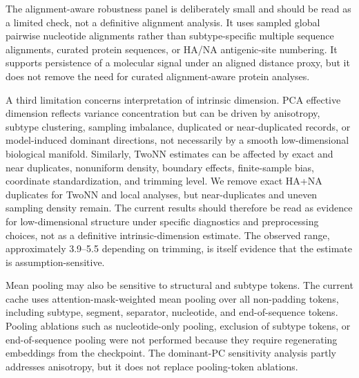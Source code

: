 \documentclass[11pt]{article}
\begin{document}
The alignment-aware robustness panel is deliberately small and should be read as a limited check, not a definitive alignment analysis. It uses sampled global pairwise nucleotide alignments rather than subtype-specific multiple sequence alignments, curated protein sequences, or HA/NA antigenic-site numbering. It supports persistence of a molecular signal under an aligned distance proxy, but it does not remove the need for curated alignment-aware protein analyses.

A third limitation concerns interpretation of intrinsic dimension. PCA effective dimension reflects variance concentration but can be driven by anisotropy, subtype clustering, sampling imbalance, duplicated or near-duplicated records, or model-induced dominant directions, not necessarily by a smooth low-dimensional biological manifold. Similarly, TwoNN estimates can be affected by exact and near duplicates, nonuniform density, boundary effects, finite-sample bias, coordinate standardization, and trimming level. We remove exact HA+NA duplicates for TwoNN and local analyses, but near-duplicates and uneven sampling density remain. The current results should therefore be read as evidence for low-dimensional structure under specific diagnostics and preprocessing choices, not as a definitive intrinsic-dimension estimate. The observed range, approximately 3.9--5.5 depending on trimming, is itself evidence that the estimate is assumption-sensitive.

Mean pooling may also be sensitive to structural and subtype tokens. The current cache uses attention-mask-weighted mean pooling over all non-padding tokens, including subtype, segment, separator, nucleotide, and end-of-sequence tokens. Pooling ablations such as nucleotide-only pooling, exclusion of subtype tokens, or end-of-sequence pooling were not performed because they require regenerating embeddings from the checkpoint. The dominant-PC sensitivity analysis partly addresses anisotropy, but it does not replace pooling-token ablations.
\end{document}
